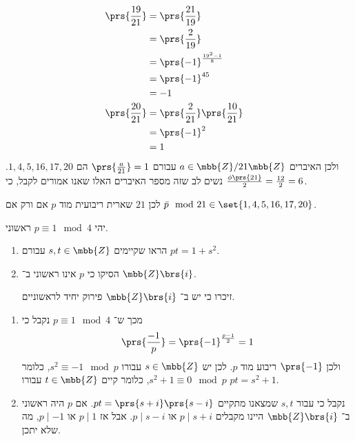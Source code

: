 \documentclass[a4paper,10pt,twoside,openany]{book}
\begin{document}
\begin{solution}
\begin{align*}
\\
\prs{\frac{19}{21}} &= \prs{\frac{21}{19}}
\\&= \prs{\frac{2}{19}}
\\&= \prs{-1}^{\frac{19^2 - 1}{8}}
\\&= \prs{-1}^{45}
\\&= -1
\\
\prs{\frac{20}{21}} &= \prs{\frac{2}{21}} \prs{\frac{10}{21}}
\\&= \prs{-1}^2
\\&= 1
\end{align*}
ולכן האיברים
$a \in \mbb{Z} / 21 \mbb{Z}$
עבורם
$\prs{\frac{a}{21}} = 1$
הם
$1, 4, 5, 16, 17, 20$.
נשים לב שזה מספר האיברים האלו שאנו אמורים לקבל, כי
$\frac{\phi\prs{21}}{2} = \frac{12}{2} = 6$.

לכן
$21$
שארית ריבועית מוד
$p$
אם ורק אם
$\bar{p} \mod{21} \in \set{1,4,5,16,17,20}$.
\end{solution}

\begin{exercisechap}
יהי
$p \equiv 1 \mod{4}$
ראשוני.

\begin{enumerate}
\item הראו שקיימים
$s,t \in \mbb{Z}$
עבורם
$pt = 1 + s^2$.

\item הסיקו כי
$p$
אינו ראשוני ב־%
$\mbb{Z}\brs{i}$.

זיכרו כי יש ב־%
$\mbb{Z}\brs{i}$
פירוק יחיד לראשוניים.
\end{enumerate}
\end{exercisechap}

\begin{solution}
\begin{enumerate}
\item
מכך ש־%
$p \equiv 1 \mod{4}$
נקבל כי
\[\prs{\frac{-1}{p}} = \prs{-1}^{\frac{p-1}{2}} = 1\]
ולכן
$\prs{-1}$
ריבוע מוד
$p$.
לכן יש
$s \in \mbb{Z}$
עבורו
$s^2 \equiv -1 \mod{p}$,
כלומר
$s^2 + 1 \equiv 0 \mod{p}$,
כלומר קיים
$t \in \mbb{Z}$
עבורו
$pt = s^2 + 1$.

\item 
נקבל כי עבור
$s,t$
שמצאנו מתקיים
$pt = \prs{s+i}\prs{s-i}$.
אם
$p$
היה ראשוני ב־%
$\mbb{Z}\brs{i}$
היינו מקבלים
$p \mid s+i$
או
$p \mid s-i$.
אבל אז
$p \mid 1$
או
$p \mid -1$,
מה שלא יתכן.
\end{enumerate}
\end{solution}

\printbibliography
\end{document}
